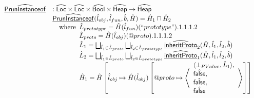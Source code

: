 \[\begin{array}{ll}
\widehat{\underline{\sf PrunInstanceof}} &:  \widehat{\mbox{\textsf{Loc}}} \times \widehat{\mbox{\textsf{Loc}}} \times \widehat{\mbox{\textsf{Bool}}} \times \widehat{\mbox{\textsf{Heap}}} \rightarrow \widehat{\mbox{\textsf{Heap}}}\\
& \widehat{\underline{\sf PrunInstanceof}} (\hat{l}_{obj}, \hat{l}_{fun}, \hat{b}, \hat{H}) = \hat{H}_1 \sqcap \hat{H}_2\\
& \quad{\rm where}\begin{array}[t]{l}
  \hat{L}_{prototype} = \hat{H}(\hat{l}_{fun})(``prototype").1.1.1.2\\
  \hat{L}_{proto} = \hat{H}(\hat{l}_{obj})(@proto).1.1.1.2\\
  \hat{L}_1 = 
      \bigsqcup_{\hat{l}_1 \in \hat{L}_{proto}} \bigsqcup_{\hat{l}_2 \in \hat{L}_{prototype}} \widehat{\underline{\sf inheritProto}}_2(\hat{H}, \hat{l}_1, \hat{l}_2, \hat{b})\\
  \hat{L}_2 = 
      \bigsqcup_{\hat{l}_1 \in \hat{L}_{proto}} \bigsqcup_{\hat{l}_2 \in \hat{L}_{prototype}} \widehat{\underline{\sf inheritProto}}_1(\hat{H}, \hat{l}_1, \hat{l}_2, \hat{b})\\
  \hat{H}_1 = 
      \hat{H} \left[ \hat{l}_{obj} \mapsto \hat{H}(\hat{l}_{obj}) \left[ @proto \mapsto 
        \left\langle 
        \begin{array}{l}
        \langle \bot_{PValue}, \hat{L}_1 \rangle,\\
        \hat{\mbox{\textsf{false}}},\\
        \hat{\mbox{\textsf{false}}},\\
        \hat{\mbox{\textsf{false}}}\\
        \end{array}
        \right\rangle      
      \right]\right]\\
\end{array}
\end{array}\]
